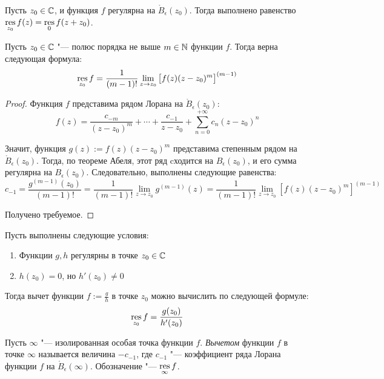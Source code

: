 \begin{note}
	Пусть $z_0 \in \mathbb{C}$, и функция $f$ регулярна на $\mathring B_\epsilon(z_0)$. Тогда выполнено равенство $\operatorname*{res}\limits_{z_0}f(z) = \operatorname*{res}\limits_0f(z + z_0)$.
\end{note}

\begin{proposition}
	Пусть $z_0 \in \mathbb{C}$ "--- полюс порядка не выше $m \in \mathbb{N}$ функции $f$. Тогда верна следующая формула:
	\[\operatorname*{res}_{z_0}f = \frac{1}{(m-1)!}\lim_{z \to z_0}\big[f(z)(z - z_0)^m\big]^{(m-1)}\]
\end{proposition}

\begin{proof}
	Функция $f$ представима рядом Лорана на $\mathring B_\epsilon(z_0)$:
	\[f(z) = \frac{c_{-m}}{(z-z_0)^m} + \dotsb + \frac{c_{-1}}{z-z_0} + \sum_{n = 0}^{+\infty}c_n(z - z_0)^n\]
	
	Значит, функция $g(z) := f(z)(z-z_0)^m$ представима степенным рядом на $\mathring B_\epsilon(z_0)$. Тогда, по теореме Абеля, этот ряд cходится на $B_\epsilon(z_0)$, и его сумма регулярна на $B_\epsilon(z_0)$. Следовательно, выполнены следующие равенства:
	\[c_{-1} = \frac{g^{(m-1)}(z_0)}{(m-1)!} = \frac1{{(m-1)!}}\lim_{z \to z_0}g^{(m-1)}(z) = \frac{1}{(m-1)!}\lim_{z \to z_0}\left[f(z)(z - z_0)^m\right]^{(m-1)}\]
	
	Получено требуемое.
\end{proof}

\begin{unnecessary}
    \begin{proposition}
    	Пусть выполнены следующие условия:
    	\begin{enumerate}
    		\item Функции $g, h$ регулярны в точке $z_0 \in \mathbb{C}$
    		\item $h(z_0) = 0$, но $h'(z_0) \ne 0$
    	\end{enumerate}
    
    	Тогда вычет функции $f := \frac{g}{h}$ в точке $z_0$ можно вычислить по следующей формуле:
    	\[\operatorname*{res}_{z_0}f = \frac{g(z_0)}{h'(z_0)}\]
    \end{proposition}
\end{unnecessary}

\begin{definition}
	Пусть $\infty$ "--- изолированная особая точка функции $f$. \textit{Вычетом} функции $f$ в точке $\infty$ называется величина $-c_{-1}$, где $c_{-1}$ "--- коэффициент ряда Лорана функции $f$ на $\mathring B_\epsilon(\infty)$. Обозначение "--- $\operatorname*{res}\limits_{\infty}f$.
\end{definition}

